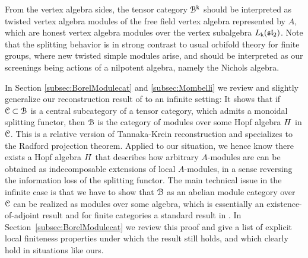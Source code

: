\documentclass[a4paper, reqno]{amsart}
\theoremstyle{introTheorems}
\newcommand\cB{\mathcal{B}}
\renewcommand\sl{\mathfrak{sl}}
\renewcommand{\1}{\mathbbold{1}}
\begin{document}
From the vertex algebra sides, the tensor category $\cB^\k$ should be interpreted as twisted vertex algebra modules of the free field vertex algebra represented by $A$, which are honest vertex algebra modules over the vertex subalgebra $L_\k(\sl_2)$. Note that the splitting behavior is in strong contrast to usual orbifold theory for finite groups, where new twisted simple modules arise, and should be interpreted as our screenings being actions of a nilpotent algebra, namely the Nichols algebra. 

In Section \ref{subsec:BorelModulecat} and \ref{subsec:Mombelli} we review and slightly generalize our reconstruction result of \cite{LM25} to an infinite setting: It shows that if $\mathcal{C}\subset \mathcal{B}$ is a central subcategory of a tensor category, which admits  a monoidal splitting functor, then $\mathcal{B}$ is the category of modules over some Hopf algebra $H$ in $\mathcal{C}$. This is a relative version of Tannaka-Krein reconstruction and specializes to the Radford projection theorem. Applied to our situation, we hence know there exists a Hopf algebra $H$ that describes how arbitrary $A$-modules are can be obtained as indecomposable extensions of local $A$-modules, in a sense reversing the information loss of the splitting functor. The main technical issue in the infinite case is that we have to show that $\mathcal{B}$ as an abelian module category over $\mathcal{C}$ can be realized as modules over some algebra, which is essentially an existence-of-adjoint result and for finite categories a standard result in \cite{DSPS19}. In Section~\ref{subsec:BorelModulecat} we review this proof and give a list of explicit local finiteness properties under which the result still holds, and which clearly hold in situations like ours.
\end{document}
